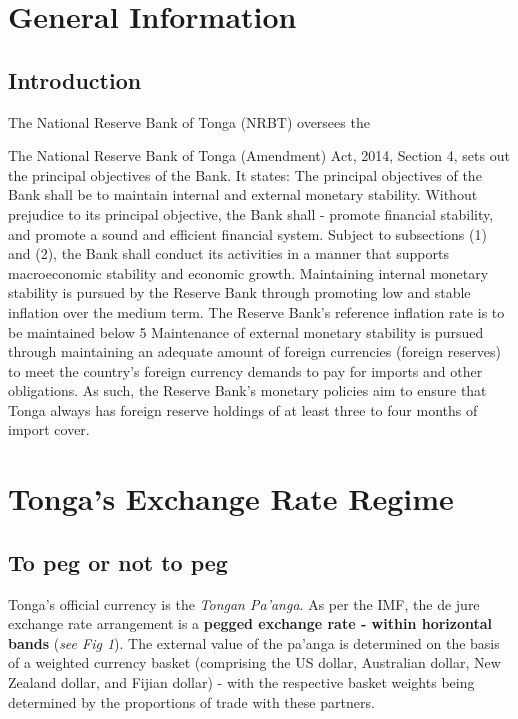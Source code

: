 \documentclass[12pt]{article}
\begin{document}
\section{General Information}
\subsection{Introduction}

The National Reserve Bank of Tonga (NRBT) oversees the 

The National Reserve Bank of Tonga (Amendment) Act, 2014, Section 4, sets out the principal objectives of the Bank. It states:
The principal objectives of the Bank shall be to maintain internal and external monetary stability.
Without prejudice to its principal objective, the Bank shall -
promote financial stability, and
promote a sound and efficient financial system.
Subject to subsections (1) and (2), the Bank shall conduct its activities in a manner that supports macroeconomic stability and economic growth.
Maintaining internal monetary stability is pursued by the Reserve Bank through promoting low and stable inflation over the medium term. The Reserve Bank's reference inflation rate is to be maintained below 5%
Maintenance of external monetary stability is pursued through maintaining an adequate amount of foreign currencies (foreign reserves) to meet the country's foreign currency demands to pay for imports and other obligations. As such, the Reserve Bank's monetary policies aim to ensure that Tonga always has foreign reserve holdings of at least three to four months of import cover.



\section{Tonga's Exchange Rate Regime}
\subsection{To peg or not to peg}
Tonga's official currency is the \textit{Tongan Pa'anga}. As per the IMF, the de jure exchange rate arrangement is a \textbf{pegged exchange rate - within horizontal bands} (\textit{see Fig 1}). The external value of the pa'anga is determined on the basis of a weighted currency basket (comprising the US dollar, Australian dollar, New Zealand dollar, and Fijian dollar) - with the respective basket weights being determined by the proportions of trade with these partners.
\end{document}

